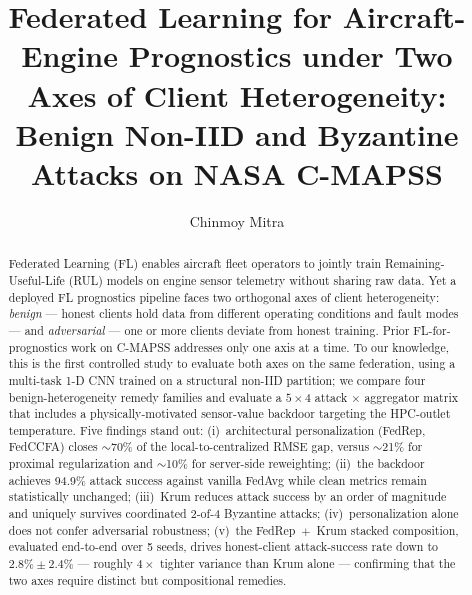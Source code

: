 \documentclass[preprint,12pt,authoryear]{elsarticle}
\begin{document}
\begin{frontmatter}

\title{Federated Learning for Aircraft-Engine Prognostics under Two
Axes of Client Heterogeneity: Benign Non-IID and Byzantine Attacks
on NASA C-MAPSS}

\author[label1]{Chinmoy Mitra}



\begin{abstract}
Federated Learning (FL) enables aircraft fleet operators to jointly
train Remaining-Useful-Life (RUL) models on engine sensor telemetry
without sharing raw data. Yet a deployed FL prognostics pipeline
faces two orthogonal axes of client heterogeneity: \emph{benign} ---
honest clients hold data from different operating conditions and
fault modes --- and \emph{adversarial} --- one or more clients
deviate from honest training. Prior FL-for-prognostics work on
C-MAPSS addresses only one axis at a time. To our knowledge, this
is the first controlled study to evaluate both axes on the same
federation, using a multi-task 1-D CNN trained on a structural
non-IID partition; we compare four benign-heterogeneity remedy
families and evaluate a $5 \times 4$ attack $\times$ aggregator
matrix that includes a physically-motivated sensor-value backdoor
targeting the HPC-outlet temperature. Five findings stand out: (i)~architectural
personalization (FedRep, FedCCFA) closes $\sim$70\% of the
local-to-centralized RMSE gap, versus $\sim$21\% for proximal
regularization and $\sim$10\% for server-side reweighting; (ii)~the backdoor achieves 94.9\% attack success
against vanilla FedAvg while clean metrics remain statistically
unchanged; (iii)~Krum reduces attack success by an order of magnitude
and uniquely survives coordinated 2-of-4 Byzantine attacks;
(iv)~personalization alone does not confer adversarial robustness;
(v)~the FedRep~$+$~Krum stacked composition, evaluated end-to-end
over 5 seeds, drives honest-client attack-success rate down to
$2.8\% \pm 2.4\%$ --- roughly $4\times$ tighter variance than
Krum alone --- confirming that the two axes require distinct but
compositional remedies.
\end{abstract}


\end{frontmatter}
\end{document}
